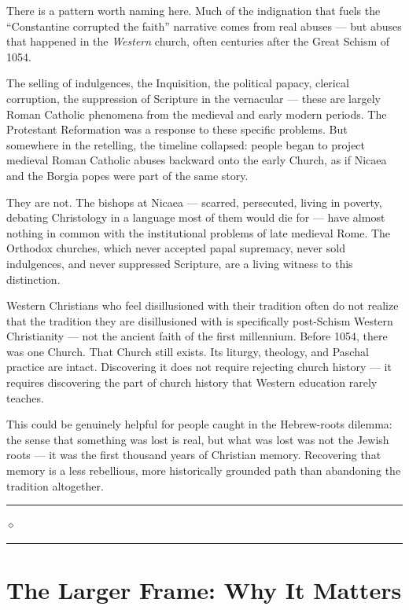 \documentclass[10pt,twoside,openany]{book}
\newcommand{\ornrule}{%
  \par\bigskip
  {\noindent\hfil{\color{gold}\rule[0.5ex]{1.5in}{0.5pt}%
  \quad$\diamond$\quad%
  \rule[0.5ex]{1.5in}{0.5pt}}\hfil\par}%
  \bigskip
}
\begin{document}
\begin{westernbox}
There is a pattern worth naming here. Much of the
indignation that fuels the ``Constantine corrupted the
faith'' narrative comes from real abuses --- but abuses
that happened in the \emph{Western} church, often centuries
after the Great Schism of 1054.

The selling of indulgences, the Inquisition, the
political papacy, clerical corruption, the suppression
of Scripture in the vernacular --- these are largely
Roman Catholic phenomena from the medieval and early
modern periods. The Protestant Reformation was a
response to these specific problems. But somewhere in
the retelling, the timeline collapsed: people began to
project medieval Roman Catholic abuses backward onto
the early Church, as if Nicaea and the Borgia popes
were part of the same story.

They are not. The bishops at Nicaea --- scarred,
persecuted, living in poverty, debating Christology in
a language most of them would die for --- have almost
nothing in common with the institutional problems of
late medieval Rome. The Orthodox churches, which never
accepted papal supremacy, never sold indulgences, and
never suppressed Scripture, are a living witness to
this distinction.

Western Christians who feel disillusioned with their
tradition often do not realize that the tradition they
are disillusioned with is specifically post-Schism
Western Christianity --- not the ancient faith of the
first millennium. Before 1054, there was one Church.
That Church still exists. Its liturgy, theology, and
Paschal practice are intact. Discovering it does not
require rejecting church history --- it requires
discovering the part of church history that Western
education rarely teaches.

This could be genuinely helpful for people caught in
the Hebrew-roots dilemma: the sense that something was
lost is real, but what was lost was not the Jewish
roots --- it was the first thousand years of Christian
memory. Recovering that memory is a less rebellious,
more historically grounded path than abandoning the
tradition altogether.
\end{westernbox}

\ornrule



\part{The Larger Frame: Why It Matters}
\end{document}
